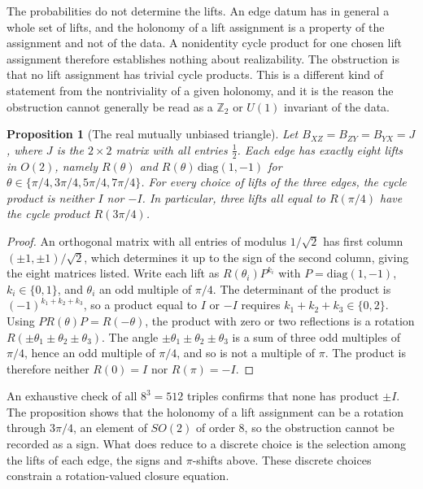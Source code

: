 \documentclass[11pt,oneside]{book}
\newtheorem{proposition}[theorem]{Proposition}
\theoremstyle{definition}
\theoremstyle{remark}
\begin{document}
The probabilities do not determine the lifts. An edge datum has in general a whole set of lifts, and the holonomy of a lift assignment is a property of the assignment and not of the data. A nonidentity cycle product for one chosen lift assignment therefore establishes nothing about realizability. The obstruction is that no lift assignment has trivial cycle products. This is a different kind of statement from the nontriviality of a given holonomy, and it is the reason the obstruction cannot generally be read as a $\mathbb Z_2$ or $U(1)$ invariant of the data.

\begin{proposition}[The real mutually unbiased triangle]\label{prop:mub-lifts}
Let $B_{XZ}=B_{ZY}=B_{YX}=J$, where $J$ is the $2\times2$ matrix with all entries $\tfrac12$. Each edge has exactly eight lifts in $O(2)$, namely $R(\theta)$ and $R(\theta)\,\mathrm{diag}(1,-1)$ for $\theta\in\{\pi/4,3\pi/4,5\pi/4,7\pi/4\}$. For every choice of lifts of the three edges, the cycle product is neither $I$ nor $-I$. In particular, three lifts all equal to $R(\pi/4)$ have the cycle product $R(3\pi/4)$.
\end{proposition}

\begin{proof}
An orthogonal matrix with all entries of modulus $1/\sqrt2$ has first column $(\pm1,\pm1)/\sqrt2$, which determines it up to the sign of the second column, giving the eight matrices listed. Write each lift as $R(\theta_i)P^{k_i}$ with $P=\mathrm{diag}(1,-1)$, $k_i\in\{0,1\}$, and $\theta_i$ an odd multiple of $\pi/4$. The determinant of the product is $(-1)^{k_1+k_2+k_3}$, so a product equal to $I$ or $-I$ requires $k_1+k_2+k_3\in\{0,2\}$. Using $PR(\theta)P=R(-\theta)$, the product with zero or two reflections is a rotation $R(\pm\theta_1\pm\theta_2\pm\theta_3)$. The angle $\pm\theta_1\pm\theta_2\pm\theta_3$ is a sum of three odd multiples of $\pi/4$, hence an odd multiple of $\pi/4$, and so is not a multiple of $\pi$. The product is therefore neither $R(0)=I$ nor $R(\pi)=-I$.
\end{proof}

An exhaustive check of all $8^3=512$ triples confirms that none has product $\pm I$. The proposition shows that the holonomy of a lift assignment can be a rotation through $3\pi/4$, an element of $SO(2)$ of order $8$, so the obstruction cannot be recorded as a sign. What does reduce to a discrete choice is the selection among the lifts of each edge, the signs and $\pi$-shifts above. These discrete choices constrain a rotation-valued closure equation.
\end{document}
